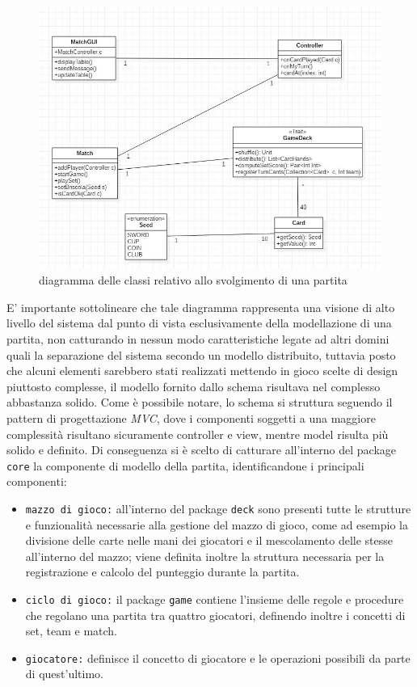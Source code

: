 \begin{figure}[H]
  \includegraphics[width=\textwidth,height=\textheight,keepaspectratio]{initialArchitecture}
   \caption{diagramma delle classi relativo allo svolgimento di una partita}
\end{figure}

 E' importante sottolineare che tale diagramma rappresenta una visione di alto livello del sistema dal punto di vista esclusivamente della modellazione di una partita, non catturando in nessun modo caratteristiche legate ad altri domini quali la separazione del sistema secondo un modello distribuito, tuttavia posto che alcuni elementi sarebbero stati realizzati mettendo in gioco scelte di design piuttosto complesse, il modello fornito dallo schema risultava nel complesso abbastanza solido.
 Come è possibile notare, lo schema si struttura seguendo il pattern di progettazione \textit{MVC}, dove i componenti soggetti a una maggiore complessità risultano sicuramente controller e view, mentre model risulta più solido e definito.
 Di conseguenza si è scelto di catturare all'interno del package \texttt{core} la componente di modello della partita, identificandone i principali componenti:

\begin{itemize}
  \item{\texttt{mazzo di gioco:}} all'interno del package \texttt{deck} sono presenti tutte le strutture e funzionalità necessarie alla gestione del mazzo di gioco, come ad esempio la divisione delle carte nelle mani dei giocatori e il mescolamento delle stesse all'interno del mazzo; viene definita inoltre la struttura necessaria per la registrazione e calcolo del punteggio durante la partita.


  \item{\texttt{ciclo di gioco:}} il package \texttt{game} contiene l'insieme delle regole e procedure che regolano una partita tra quattro giocatori, definendo inoltre i concetti di set, team e match.

  \item{\texttt{giocatore:}} definisce il concetto di giocatore e le operazioni possibili da parte di quest'ultimo.

\end{itemize}

